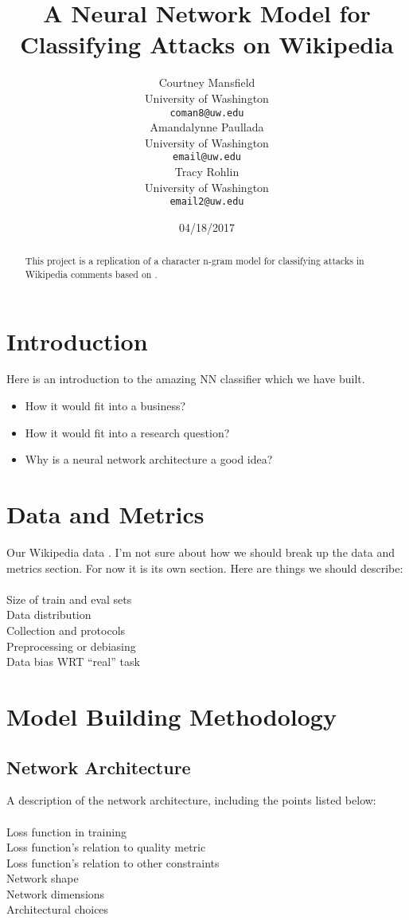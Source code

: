 \documentclass[11pt]{article}
\title{A Neural Network Model for Classifying Attacks on Wikipedia}
\author{Courtney Mansfield \\
  University of Washington \\
  {\tt coman8@uw.edu} \\\And
  Amandalynne Paullada \\
  University of Washington \\
  {\tt email@uw.edu} \\\And 
  Tracy Rohlin\\
  University of Washington \\
  {\tt email2@uw.edu}}
\date{04/18/2017}
\begin{document}
\maketitle
\begin{abstract}
  This project is a replication of a character n-gram model for classifying attacks in Wikipedia comments based on \cite{mehdad}.
\end{abstract}

\section{Introduction}

Here is an introduction to the amazing NN classifier which we have built.\\
\begin{itemize}
  \setlength\itemsep{0em}
\item How it would fit into a business?
\item How it would fit into a research question? 
\item Why is a neural network architecture a good idea?
\end{itemize}

\section{Data and Metrics}

Our Wikipedia data \cite{wulczyn}. I'm not sure about how we should break up the data and metrics section.  For now it is its own section.  Here are things we should describe:\\
\\
Size of train and eval sets \\
Data distribution \\
Collection and protocols \\
Preprocessing or debiasing \\
Data bias WRT “real” task \\


\section{Model Building Methodology}

\subsection{Network Architecture}
A description of the network architecture, including the points listed below:\\
\\
 Loss function in training\\
 Loss function's relation to quality metric \\
 Loss function's relation to other constraints\\
 Network shape\\
 Network dimensions\\
 Architectural choices\\
\end{document}

